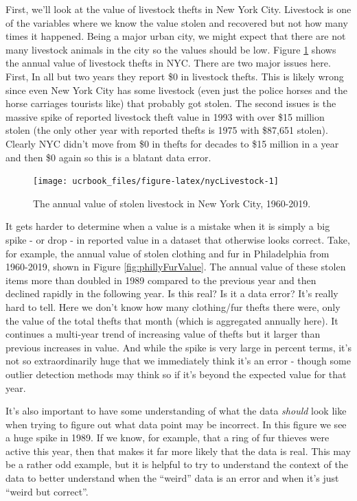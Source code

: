 \documentclass[
  12pt,
  openany]{book}
\begin{document}
First, we'll look at the value of livestock thefts in New York City. Livestock is one of the variables where we know the value stolen and recovered but not how many times it happened. Being a major urban city, we might expect that there are not many livestock animals in the city so the values should be low. Figure \ref{fig:nycLivestock} shows the annual value of livestock thefts in NYC. There are two major issues here. First, In all but two years they report \$0 in livestock thefts. This is likely wrong since even New York City has some livestock (even just the police horses and the horse carriages tourists like) that probably got stolen. The second issues is the massive spike of reported livestock theft value in 1993 with over \$15 million stolen (the only other year with reported thefts is 1975 with \$87,651 stolen). Clearly NYC didn't move from \$0 in thefts for decades to \$15 million in a year and then \$0 again so this is a blatant data error.

\begin{figure}

{\centering \texttt{[image: ucrbook\_files/figure-latex/nycLivestock-1]} 

}

\caption{The annual value of stolen livestock in New York City, 1960-2019.}\label{fig:nycLivestock}
\end{figure}

It gets harder to determine when a value is a mistake when it is simply a big spike - or drop - in reported value in a dataset that otherwise looks correct. Take, for example, the annual value of stolen clothing and fur in Philadelphia from 1960-2019, shown in Figure \ref{fig:phillyFurValue}. The annual value of these stolen items more than doubled in 1989 compared to the previous year and then declined rapidly in the following year. Is this real? Is it a data error? It's really hard to tell. Here we don't know how many clothing/fur thefts there were, only the value of the total thefts that month (which is aggregated annually here). It continues a multi-year trend of increasing value of thefts but it larger than previous increases in value. And while the spike is very large in percent terms, it's not so extraordinarily huge that we immediately think it's an error - though some outlier detection methods may think so if it's beyond the expected value for that year.

It's also important to have some understanding of what the data \emph{should} look like when trying to figure out what data point may be incorrect. In this figure we see a huge spike in 1989. If we know, for example, that a ring of fur thieves were active this year, then that makes it far more likely that the data is real. This may be a rather odd example, but it is helpful to try to understand the context of the data to better understand when the ``weird'' data is an error and when it's just ``weird but correct''.
\end{document}
